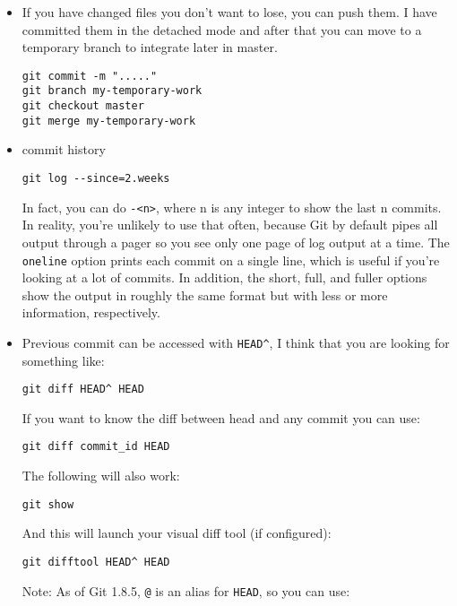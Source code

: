 \begin{itemize}
\item If you have changed files you don't want to lose, you can push them. I have committed them in the detached mode and after that you can move to a temporary branch to integrate later in master.

\begin{verbatim}
git commit -m "....."
git branch my-temporary-work
git checkout master
git merge my-temporary-work
\end{verbatim}

\item commit history

\begin{verbatim}
git log --since=2.weeks
\end{verbatim}

In fact, you can do \verb=-<n>=, where n is any integer to show the last n commits. In reality, you’re unlikely to use that often, because Git by default pipes all output through a pager so you see only one page of log output at a time. The \verb=oneline= option prints each commit on a single line, which is useful if you’re looking at a lot of commits. In addition, the short, full, and fuller options show the output in roughly the same format but with less or more information, respectively.

\item Previous commit can be accessed with \verb=HEAD^=, I think that you are looking for something like:

\begin{verbatim}
git diff HEAD^ HEAD
\end{verbatim}

If you want to know the diff between head and any commit you can use:

\begin{verbatim}
git diff commit_id HEAD
\end{verbatim}

The following will also work:

\begin{verbatim}
git show
\end{verbatim}

And this will launch your visual diff tool (if configured):

\begin{verbatim}
git difftool HEAD^ HEAD
\end{verbatim}

Note: As of Git 1.8.5, \verb=@= is an alias for \verb=HEAD=, so you can use:


\end{itemize}
